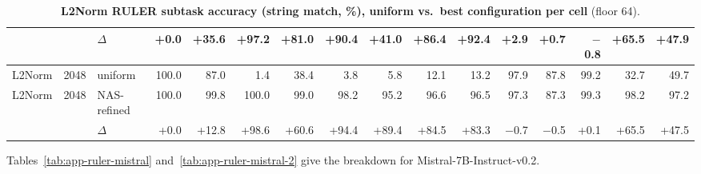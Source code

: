 \begin{table}[t]
\begin{tabular}{@{}l r l r r r r r r r r r r r r r @{}}
     &  & $\Delta$ & +0.0 & +35.6 & +97.2 & +81.0 & +90.4 & +41.0 & +86.4 & +92.4 & +2.9 & +0.7 & $-$0.8 & +65.5 & +47.9 \\
    \midrule
    L2Norm & 2048 & uniform & 100.0 & 87.0 & 1.4 & 38.4 & 3.8 & 5.8 & 12.1 & 13.2 & 97.9 & 87.8 & 99.2 & 32.7 & 49.7 \\
    L2Norm & 2048 & NAS-refined & 100.0 & 99.8 & 100.0 & 99.0 & 98.2 & 95.2 & 96.6 & 96.5 & 97.3 & 87.3 & 99.3 & 98.2 & 97.2 \\
     &  & $\Delta$ & +0.0 & +12.8 & +98.6 & +60.6 & +94.4 & +89.4 & +84.5 & +83.3 & $-$0.7 & $-$0.5 & +0.1 & +65.5 & +47.5 \\
    \bottomrule
  \end{tabular}
  \caption{\textbf{L2Norm RULER subtask accuracy (string match, \%), uniform vs.\ best configuration per cell} (floor 64).}
  \label{tab:app-ruler-l2norm}
\end{table}


Tables~\ref{tab:app-ruler-mistral} and~\ref{tab:app-ruler-mistral-2} give the breakdown for Mistral-7B-Instruct-v0.2.

